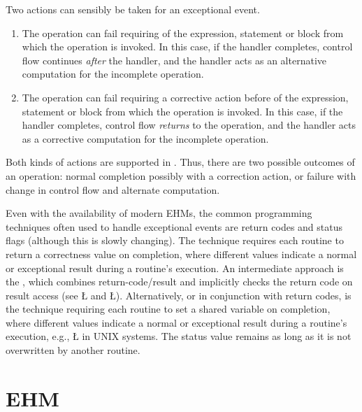 \documentclass[openright,twoside]{report}
\begin{document}
Two actions can sensibly be taken for an exceptional event.
\begin{enumerate}
\item
The operation can fail requiring  of the expression, statement or block from which the operation is invoked.
In this case, if the handler completes, control flow continues \emph{after} the handler, and the handler acts as an alternative computation for the incomplete operation.

\item
The operation can fail requiring a corrective action before  of the expression, statement or block from which the operation is invoked.
In this case, if the handler completes, control flow \emph{returns} to the operation, and the handler acts as a corrective computation for the incomplete operation. 
\end{enumerate}
Both kinds of actions are supported in \uC.
Thus, there are two possible outcomes of an operation: normal completion possibly with a correction action, or failure with change in control flow and alternate computation.

\begin{annotation}
Even with the availability of modern EHMs, the common programming techniques often used to handle exceptional events are return codes and status flags (although this is slowly changing).
The  technique requires each routine to return a correctness value on completion, where different values indicate a normal or exceptional result during a routine's execution.
An intermediate approach is the , which combines return-code/result and implicitly checks the return code on result access (see \CC \LGinlinetrue\LGbegin\lgrinde\L{}\endlgrinde\LGend{} and \LGinlinetrue\LGbegin\lgrinde\L{}\endlgrinde\LGend{}).
Alternatively, or in conjunction with return codes, is the  technique requiring each routine to set a shared variable on completion, where different values indicate a normal or exceptional result during a routine's execution, e.g., \LGinlinetrue\LGbegin\lgrinde\L{}\endlgrinde\LGend{} in UNIX systems.
The status value remains as long as it is not overwritten by another routine.
\end{annotation}


\section{\texorpdfstring{\uC EHM}{uC++ EHM}}
\end{document}
